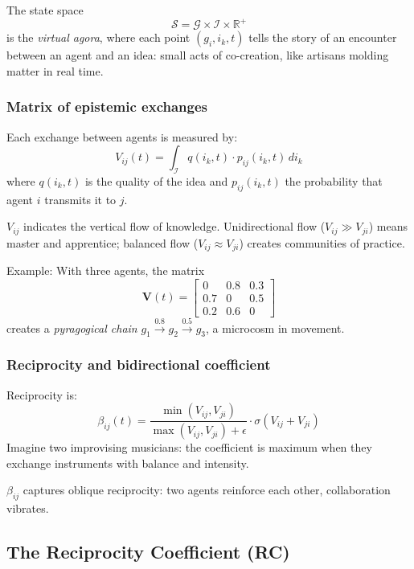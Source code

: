 The state space
\[
\mathcal{S} = \mathcal{G} \times \mathcal{I} \times \mathbb{R}^+
\]
is the \textit{virtual agora}, where each point $(g_i, i_k, t)$ tells the story of an encounter between an agent and an idea: small acts of co-creation, like artisans molding matter in real time.

\subsubsection{Matrix of epistemic exchanges}
\label{subsubsec:epistemic-matrix}

Each exchange between agents is measured by:
\[
V_{ij}(t) = \int_{\mathcal{I}} q(i_k,t) \cdot p_{ij}(i_k,t) \, di_k
\]
where $q(i_k,t)$ is the quality of the idea and $p_{ij}(i_k,t)$ the probability that agent $i$ transmits it to $j$.

\begin{tcolorbox}[title=Interpretation of Flows, colback=blue!5!white]
	$V_{ij}$ indicates the vertical flow of knowledge. Unidirectional flow ($V_{ij} \gg V_{ji}$) means master and apprentice; balanced flow ($V_{ij} \approx V_{ji}$) creates communities of practice.
\end{tcolorbox}

Example: With three agents, the matrix
\[
\mathbf{V}(t) = \begin{bmatrix}
	0 & 0.8 & 0.3 \\
	0.7 & 0 & 0.5 \\
	0.2 & 0.6 & 0
\end{bmatrix}
\]
creates a \textit{pyragogical chain} $g_1 \xrightarrow{0.8} g_2 \xrightarrow{0.5} g_3$, a microcosm in movement.

\subsubsection{Reciprocity and bidirectional coefficient}

Reciprocity is:
\[
\beta_{ij}(t) = \frac{\min(V_{ij},V_{ji})}{\max(V_{ij},V_{ji}) + \epsilon} \cdot \sigma(V_{ij}+V_{ji})
\]
Imagine two improvising musicians: the coefficient is maximum when they exchange instruments with balance and intensity.

\begin{tcolorbox}[title=Metaphor of Reciprocity, colback=green!5!white]
	$\beta_{ij}$ captures oblique reciprocity: two agents reinforce each other, collaboration vibrates.
\end{tcolorbox}

\subsection{The Reciprocity Coefficient (RC)}
\label{subsec:rc-rigorous-definition}

